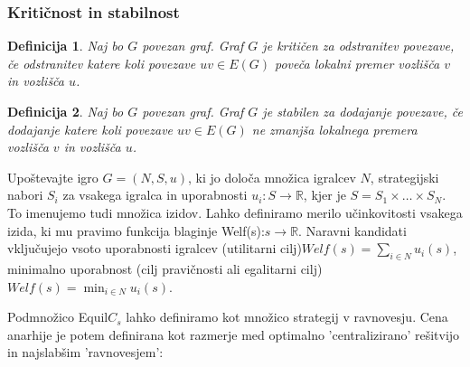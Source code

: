 \documentclass[12pt, hyperref={unicode}]{beamer}
\newtheorem{definicija}{Definicija}
\begin{document}
\begin{frame}
   
    \frametitle{Kritičnost in stabilnost}  
    \begin{definicija}
    Naj bo $G$ povezan graf. Graf $G$ je \textit{kritičen za odstranitev povezave},
    če odstranitev katere koli povezave $uv \in E(G)$ poveča lokalni premer vozlišča $v$ in vozlišča $u$.
    \end{definicija}
    
    \begin{definicija}
    Naj bo $G$ povezan graf. Graf $G$ je \textit{stabilen za dodajanje povezave},
    če dodajanje katere koli povezave $uv \in E(G)$ ne zmanjša lokalnega premera vozlišča $v$ in vozlišča $u$.
    \end{definicija}

\end{frame}

\begin{frame}

  Upoštevajte igro \( G = (N, S, u) \), ki jo določa množica igralcev \( N \), strategijski nabori \( S_i \) za vsakega igralca in uporabnosti \( u_i : S \to \mathbb{R}\), kjer je \( S = S_1 \times \ldots \times S_N\). To imenujemo tudi množica izidov. Lahko definiramo merilo učinkovitosti vsakega izida, ki mu pravimo funkcija blaginje Welf(s):\( s\to \mathbb{R}\). Naravni kandidati vključujejo vsoto uporabnosti igralcev (utilitarni cilj)\( Welf(s)=\sum_{i\in N}u_i(s)\), minimalno uporabnost (cilj pravičnosti ali egalitarni cilj)\( Welf(s)=\min_{i\in N}u_i(s)\).


Podmnožico Equil\( C_s\) lahko definiramo kot množico strategij v ravnovesju. Cena anarhije je potem definirana kot razmerje med optimalno 'centralizirano' rešitvijo in najslabšim 'ravnovesjem':

\end{frame}
\end{document}
